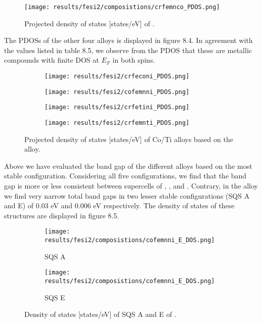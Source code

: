 \begin{figure}[H]
\centering
\texttt{[image: results/fesi2/composistions/crfemnco\_PDOS.png]}
\caption{Projected density of states [states/eV] of .}
\end{figure}

The PDOSs of the other four alloys is displayed in figure 8.4. In agreement with the values listed in table 8.5, we observe from the PDOS that these are metallic compounds with finite DOS at $E_F$ in both spins. 
 
\begin{figure}[H]
\begin{subfigure}{.5\textwidth}
\texttt{[image: results/fesi2/crfeconi\_PDOS.png]}
\caption{}
\end{subfigure}
\begin{subfigure}{.5\textwidth}
\texttt{[image: results/fesi2/cofemnni\_PDOS.png]}
\caption{}
\end{subfigure}
\begin{subfigure}{.5\textwidth}
\texttt{[image: results/fesi2/crfetini\_PDOS.png]}
\caption{}
\end{subfigure}
\begin{subfigure}{.5\textwidth}
\texttt{[image: results/fesi2/crfemnti\_PDOS.png]}
\caption{}
\end{subfigure}
\caption{Projected density of states [states/eV] of Co/Ti alloys based on the  alloy.}
\end{figure}

Above we have evaluated the band gap of the different alloys based on the most stable configuration. Considering all five configurations, we find that the band gap is more or less consistent between supercells of ,  ,  and . Contrary, in the  alloy we find very narrow total band gaps in two lesser stable configurations (SQS A and E) of 0.03 eV and 0.006 eV respectively. The density of states of these structures are displayed in figure 8.5.

\begin{figure}[H]
\begin{subfigure}{.5\textwidth}
\texttt{[image: results/fesi2/composistions/cofemnni\_E\_DOS.png]}
\caption{SQS A}
\end{subfigure}
\begin{subfigure}{.5\textwidth}
\texttt{[image: results/fesi2/composistions/cofemnni\_E\_DOS.png]}
\caption{SQS E}
\end{subfigure}
\caption{Density of states [states/eV] of SQS A and E of .}
\end{figure} 

